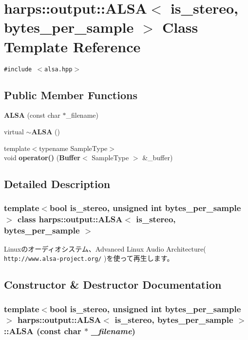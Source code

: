 \section{harps::output::ALSA$<$ is\_\-stereo, bytes\_\-per\_\-sample $>$ Class Template Reference}
\label{classharps_1_1output_1_1ALSA}
{\tt \#include $<$alsa.hpp$>$}

\subsection*{Public Member Functions}
\begin{CompactItemize}
\item 
{\bf ALSA} (const char $\ast$\_\-filename)
\item 
virtual {\bf $\sim$ALSA} ()
\item 
{\footnotesize template$<$typename SampleType$>$ }\\void {\bf operator()} ({\bf Buffer}$<$ SampleType $>$ \&\_\-buffer)
\end{CompactItemize}


\subsection{Detailed Description}
\subsubsection*{template$<$bool is\_\-stereo, unsigned int bytes\_\-per\_\-sample$>$ class harps::output::ALSA$<$ is\_\-stereo, bytes\_\-per\_\-sample $>$}

Linuxのオーディオシステム、Advanced Linux Audio Architecture( {\tt http://www.alsa-project.org/} )を使って再生します。 

\subsection{Constructor \& Destructor Documentation}
\subsubsection[ALSA]{\setlength{\rightskip}{0pt plus 5cm}template$<$bool is\_\-stereo, unsigned int bytes\_\-per\_\-sample$>$ {\bf harps::output::ALSA}$<$ is\_\-stereo, bytes\_\-per\_\-sample $>$::{\bf ALSA} (const char $\ast$ {\em \_\-filename})\hspace{0.3cm}{\tt  [inline]}}\label{classharps_1_1output_1_1ALSA_bd7c14ca3341300700f2f326da1d5395}


